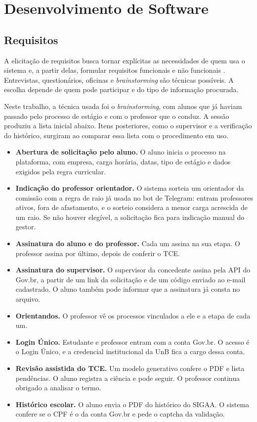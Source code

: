 \chapter{Desenvolvimento de Software}

\section{Requisitos}

A elicitação de requisitos busca tornar explícitas as necessidades de quem usa o sistema e, a partir delas, formular requisitos funcionais e não funcionais \cite{somerville2011engenharia,wiegers2013software}. Entrevistas, questionários, oficinas e \textit{brainstorming} são técnicas possíveis. A escolha depende de quem pode participar e do tipo de informação procurada.

Neste trabalho, a técnica usada foi o \textit{brainstorming}, com alunos que já haviam passado pelo processo de estágio e com o professor que o conduz. A sessão produziu a lista inicial abaixo. Itens posteriores, como o supervisor e a verificação do histórico, surgiram ao comparar essa lista com o procedimento em uso.

\begin{itemize}
    \item \textbf{Abertura de solicitação pelo aluno.} O aluno inicia o processo na plataforma, com empresa, carga horária, datas, tipo de estágio e dados exigidos pela regra curricular.
    \item \textbf{Indicação do professor orientador.} O sistema sorteia um orientador da comissão com a regra de raio já usada no bot de Telegram: entram professores ativos, fora de afastamento, e o sorteio considera a menor carga acrescida de um raio. Se não houver elegível, a solicitação fica para indicação manual do gestor.
    \item \textbf{Assinatura do aluno e do professor.} Cada um assina na sua etapa. O professor assina por último, depois de conferir o TCE.
    \item \textbf{Assinatura do supervisor.} O supervisor da concedente assina pela API do Gov.br, a partir de um link da solicitação e de um código enviado ao e-mail cadastrado. O aluno também pode informar que a assinatura já consta no arquivo.
    \item \textbf{Orientandos.} O professor vê os processos vinculados a ele e a etapa de cada um.
    \item \textbf{Login Único.} Estudante e professor entram com a conta Gov.br. O acesso é o Login Único, e a credencial institucional da UnB fica a cargo dessa conta.
    \item \textbf{Revisão assistida do TCE.} Um modelo generativo confere o PDF e lista pendências. O aluno registra a ciência e pode seguir. O professor continua obrigado a analisar o termo.
    \item \textbf{Histórico escolar.} O aluno envia o PDF do histórico do SIGAA. O sistema confere se o CPF é o da conta Gov.br e pede o captcha da validação.
\end{itemize}

